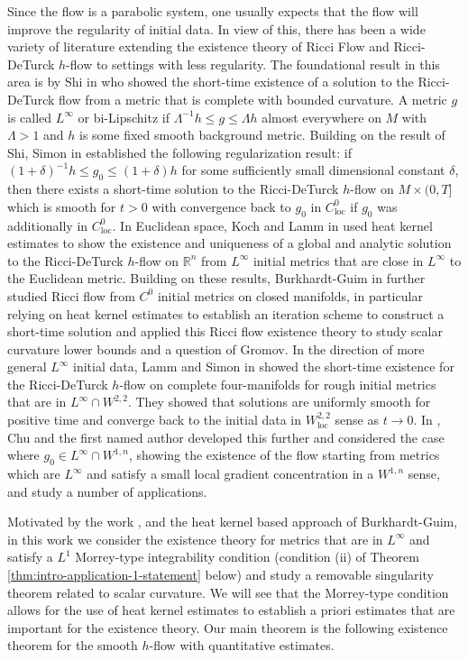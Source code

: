\documentclass[12pt]{amsart}
\theoremstyle{plain}
\theoremstyle{plain}
\theoremstyle{definition}
\theoremstyle{remark}
\numberwithin{equation}{subsection}
\begin{document}
Since the flow is a parabolic system, one usually expects that the flow will improve the regularity of initial data. In view of this, there has been a wide variety of literature extending the existence theory of Ricci Flow and Ricci-DeTurck $h$-flow to settings with less regularity. The foundational result in this area is by Shi in \cite{shi_deforming_1989} who showed the short-time existence of a solution to the Ricci-DeTurck flow from a metric that is complete with bounded curvature. A metric $g$ is called $L^\infty$ or bi-Lipschitz if $\Lambda^{-1}h \leq g \leq \Lambda h$ almost everywhere on $M$ with $\Lambda >1$ and $h$ is some fixed smooth background metric. Building on the result of Shi, Simon in \cite{simon_deformation_2002} established the following regularization result: if $(1+\delta)^{-1}h \leq g_0 \leq (1+\delta)h$ for some sufficiently small dimensional constant $\delta$, then there exists a short-time solution to the Ricci-DeTurck $h$-flow on $M \times (0,T]$ which is smooth for $t > 0$ with convergence back to $g_0$ in $C^0_\text{loc}$ if $g_0$ was additionally in $C^0_\text{loc}$. In Euclidean space, Koch and Lamm in \cite{koch_geometric_2012} used heat kernel estimates to show the existence and uniqueness of a global and analytic solution to the Ricci-DeTurck $h$-flow on $\mathbb{R}^n$ from $L^\infty$ initial metrics that are close in $L^\infty$ to the Euclidean metric. Building on these results, Burkhardt-Guim in \cite{burkhardt-guim_pointwise_2019} further studied Ricci flow from $C^0$ initial metrics on closed manifolds, in particular relying on heat kernel estimates to establish an iteration scheme to construct a short-time solution and applied this Ricci flow existence theory to study scalar curvature lower bounds and a question of Gromov. In the direction of more general $L^\infty$ initial data, Lamm and Simon in \cite{lamm_ricci_2021} showed the short-time existence for the Ricci-DeTurck $h$-flow on complete four-manifolds for rough initial metrics that are in $L^\infty \cap W^{2,2}$. They showed that solutions are uniformly smooth for positive time and converge back to the initial data in $W^{2,2}_\text{loc}$ sense as $t\to0$. In \cite{chu_ricci-deturck_2022}, Chu and the first named author developed this further and considered the case where $g_0 \in L^\infty \cap W^{1,n}$, showing the existence of the flow starting from metrics which are $L^\infty$ and satisfy a small local gradient concentration in a $W^{1,n}$ sense, and study a number of applications.

Motivated by the work \cite{chu_ricci-deturck_2022}, and the heat kernel based approach of Burkhardt-Guim, in this work we consider the existence theory for metrics that are in $L^\infty$ and satisfy a $L^1$ Morrey-type integrability condition (condition (ii) of Theorem \ref{thm:intro-application-1-statement} below) and study a removable singularity theorem related to scalar curvature. We will see that the Morrey-type condition allows for the use of heat kernel estimates to establish a priori estimates that are important for the existence theory. Our main theorem is the following existence theorem for the smooth $h$-flow with quantitative estimates.
\end{document}
